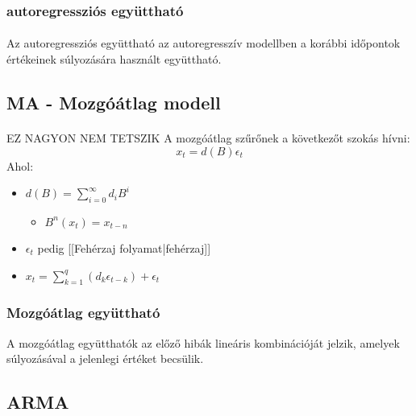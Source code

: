 \documentclass[11pt,a4pape,draftr]{article}
\begin{document}
					\subsubsection{autoregressziós együttható}
						\paragraph{}
							Az autoregressziós együttható az autoregresszív modellben a korábbi időpontok értékeinek súlyozására használt együttható.
				\subsection{MA - Mozgóátlag modell}
					\paragraph{}
						EZ NAGYON NEM TETSZIK
						A mozgóátlag szűrőnek a következőt szokás hívni:
						$$x_t = d(B) \epsilon_t$$
						Ahol:
						\begin{itemize}
							\item $d(B) = \sum_{i=0}^\infty d_iB^i$
							\begin{itemize}
								\item $B^n(x_t) = x_{t-n}$
							\end{itemize}
							\item $\epsilon_t$ pedig [[Fehérzaj folyamat|fehérzaj]]
							\item $x_t=\sum_{k = 1}^{q}(d_{k}\epsilon_{t-k})+\epsilon_t$
						\end{itemize}
					\subsubsection{Mozgóátlag együttható}
						A mozgóátlag együtthatók az előző hibák lineáris kombinációját jelzik, amelyek súlyozásával a jelenlegi értéket becsülik.
				\subsection{ARMA}
\end{document}
